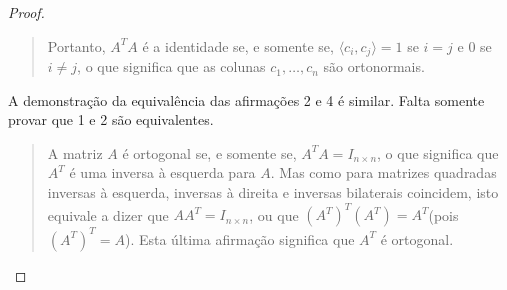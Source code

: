 \begin{proof}
\begin{quote}
			Portanto, $A^TA$ é a identidade se, e somente se, $\langle c_i,c_j\rangle=1$ se $i=j$ e $0$ se $i\neq j$, o que significa que as colunas $c_1,\ldots,c_n$ são ortonormais.
		\end{quote}
		
	A demonstração da equivalência das afirmações 2 e 4 é similar. Falta somente provar que 1 e 2 são equivalentes.
	
	\begin{quote}
		A matriz $A$ é ortogonal se, e somente se, $A^TA=I_{n\times n}$, o que significa que $A^T$ é uma inversa à esquerda para $A$. Mas como para matrizes quadradas inversas à esquerda, inversas à direita e inversas bilaterais coincidem, isto equivale a dizer que $A A^T=I_{n\times n}$, ou que $(A^T)^T(A^T)=A^T$(pois $(A^T)^T=A$). Esta última afirmação significa que $A^T$ é ortogonal.
	\end{quote}
\end{proof}